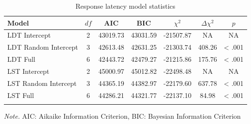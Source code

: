 \documentclass[english,man]{apa6}
\theoremstyle{definition}
\theoremstyle{definition}
\theoremstyle{definition}
\theoremstyle{remark}
\begin{document}
\begin{table}[tbp]
\begin{center}
\begin{threeparttable}
\caption{\label{tab:RT-table-model}Response latency model statistics}
\begin{tabular}{lcccccc}
\toprule
Model & $df$ & AIC & BIC & $\chi^2$ & $\Delta\chi^2$ & $p$\\
\midrule
LDT Intercept & 2 & 43019.73 & 43031.59 & -21507.87 & NA & NA\\
LDT Random Intercept & 3 & 42613.48 & 42631.25 & -21303.74 & 408.26 & < .001\\
LDT Full & 6 & 42443.72 & 42479.27 & -21215.86 & 175.76 & < .001\\
LST Intercept & 2 & 45000.97 & 45012.82 & -22498.48 & NA & NA\\
LST Random Intercept & 3 & 44365.19 & 44382.97 & -22179.60 & 637.78 & < .001\\
LST Full & 6 & 44286.21 & 44321.77 & -22137.10 & 84.98 & < .001\\
\bottomrule
\addlinespace
\end{tabular}
\begin{tablenotes}[para]
\textit{Note.} AIC: Aikaike Information Criterion, BIC: Bayesian Information Criterion
\end{tablenotes}
\end{threeparttable}
\end{center}
\end{table}
\end{document}
